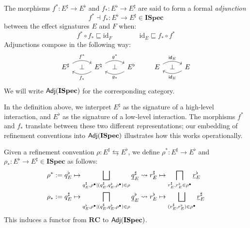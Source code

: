 \documentclass[acmsmall,review,anonymous]{acmart}\settopmatter{printfolios=true,printccs=false,printacmref=false}
\newcommand{\ISpec}{\mathbf{ISpec}}
\begin{document}
\begin{definition}[Adjunction]
The morphisms
$f^* : E^\sharp \rightarrow E^\flat$ and
$f_* : E^\flat \rightarrow E^\sharp$
are said to form a formal \emph{adjunction}
\[ f^* \dashv f_* : E^\flat \rightarrow E^\sharp \in \ISpec \]
between the effect signatures $E$ and $F$
when:
\[
  f^* \circ f_* \sqsubseteq \mathrm{id}_F
  \qquad \qquad
  \mathrm{id}_E \sqsubseteq f_* \circ f^*
\]
Adjunctions compose in the following way:
\[
  \begin{tikzcd}[sep=tiny]
    E^\sharp \ar[rr, "f^*", bend left] & \bot &
    E^\natural \ar[ll, "f_*", bend left]
      \ar[rr, "g^*", bend left] & \bot &
    E^\flat \ar[ll, "g_*", bend left]
  \end{tikzcd}
  \qquad
  \begin{tikzcd}[sep=tiny]
    E \ar[rr, "\kw{id}_E", bend left] & \bot &
    E \ar[ll, "\kw{id}_E", bend left]
  \end{tikzcd}
\]
We will write $\kw{Adj}(\ISpec)$ for the corresponding category.
\end{definition}

In the definition above,
we interpret
$E^\sharp$ as the signature of a high-level interaction, and
$E^\flat$ as the signature of a low-level interaction.
The morphisms $f^*$ and $f_*$ translate between
these two different representations;
our embedding of refinement conventions into $\kw{Adj}(\ISpec)$
illustrates how this works operationally.

\begin{definition}
Given a refinement convention $\rho : E^\sharp \leftrightarrows E^\flat$,
we define
$\rho^* : E^\sharp \rightarrow E^\flat$ and
$\rho_* : E^\flat \rightarrow E^\sharp \in \ISpec$ as follows:
\begin{align*}
  \rho^* &:= q_E^\flat \mapsto
    \bigsqcup_{q_E^\sharp, \rho^\bullet
           \mid (q_E^\sharp, q_E^\flat, \rho^\bullet) \in \rho}
    \underline{q}_E^\sharp \leadsto r_E^\sharp \mapsto
    \bigsqcap_{r_E^\sharp, r_E^\flat \in \rho^\bullet}
    \underline{r}_E^\flat
  \\
  \rho_* &:= q_E^\sharp \mapsto
    \bigsqcap_{q_E^\flat, \rho^\bullet
           \mid (q_E^\sharp, q_E^\flat, \rho^\bullet) \in \rho}
    \underline{q}_E^\flat \leadsto r_E^\flat \mapsto
    \bigsqcup_{(r_E^\sharp, r_E^\flat) \in \rho^\bullet}
    \underline{r}_E^\sharp
\end{align*}
This induces a functor from $\mathbf{RC}$ to $\kw{Adj}(\ISpec)$.
\end{definition}
\end{document}
